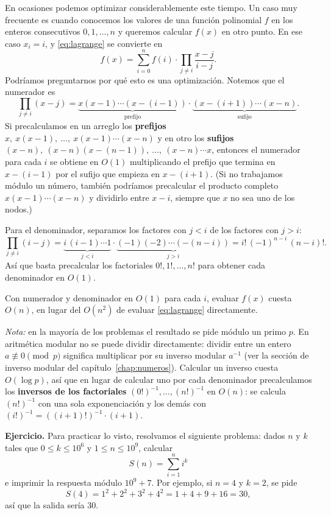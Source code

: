 En ocasiones podemos optimizar considerablemente este tiempo. Un caso muy frecuente es cuando conocemos los valores de una función polinomial $f$ en los enteros consecutivos $0,1,\dots,n$ y queremos calcular $f(x)$ en otro punto. En ese caso $x_i=i$, y \eqref{eq:lagrange} se convierte en
\[
f(x) = \sum_{i=0}^{n} f(i) \cdot \prod_{j \neq i} \frac{x - j}{i - j}.
\]
Podríamos preguntarnos por qué esto es una optimización. Notemos que el numerador es
\[
\prod_{j \neq i} (x-j)=\underbrace{x(x-1)\cdots(x-(i-1))}_{\text{prefijo}}\cdot\underbrace{(x-(i+1))\cdots(x-n)}_{\text{sufijo}}.
\]
Si precalculamos en un arreglo los \textbf{prefijos} $x,\ x(x-1),\ \dots,\ x(x-1)\cdots(x-n)$ y en otro los \textbf{sufijos} $(x-n),\ (x-n)(x-(n-1)),\ \dots,\ (x-n)\cdots x$, entonces el numerador para cada $i$ se obtiene en $O(1)$ multiplicando el prefijo que termina en $x-(i-1)$ por el sufijo que empieza en $x-(i+1)$. (Si no trabajamos módulo un número, también podríamos precalcular el producto completo $x(x-1)\cdots(x-n)$ y dividirlo entre $x-i$, siempre que $x$ no sea uno de los nodos.)

Para el denominador, separamos los factores con $j<i$ de los factores con $j>i$:
\[
\prod_{j \neq i} (i-j)=\underbrace{i\,(i-1)\cdots 1}_{j<i}\cdot\underbrace{(-1)(-2)\cdots(-(n-i))}_{j>i}=i!\,(-1)^{n-i}\,(n-i)!.
\]
Así que basta precalcular los factoriales $0!, 1!, \dots, n!$ para obtener cada denominador en $O(1)$.

Con numerador y denominador en $O(1)$ para cada $i$, evaluar $f(x)$ cuesta $O(n)$, en lugar del $O(n^2)$ de evaluar \eqref{eq:lagrange} directamente.

\textit{Nota:} en la mayoría de los problemas el resultado se pide módulo un primo $p$. En aritmética modular no se puede dividir directamente: dividir entre un entero $a\not\equiv 0 \pmod p$ significa multiplicar por su inverso modular $a^{-1}$ (ver la sección de inverso modular del capítulo~\ref{chap:numeros}). Calcular un inverso cuesta $O(\log p)$, así que en lugar de calcular uno por cada denominador precalculamos los \textbf{inversos de los factoriales} $(0!)^{-1},\dots,(n!)^{-1}$ en $O(n)$: se calcula $(n!)^{-1}$ con una sola exponenciación y los demás con $(i!)^{-1} = ((i+1)!)^{-1}\cdot(i+1)$.

\textbf{Ejercicio.} Para practicar lo visto, resolvamos el siguiente problema: dados $n$ y $k$ tales que $0 \leq k \leq 10^6$ y $1 \leq n \leq 10^9$, calcular
\[
S(n)=\sum_{i=1}^{n} i^k
\]
e imprimir la respuesta módulo $10^9+7$. Por ejemplo, si $n=4$ y $k=2$, se pide
\[
S(4)=1^2+2^2+3^2+4^2=1+4+9+16=30,
\]
así que la salida sería $30$.

